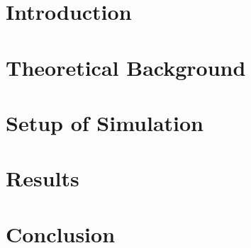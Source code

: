 \documentclass[a4paper,10pt,twoside,ngerman,bibliography=totoc]{scrreprt}
\begin{document}
	\mathswapoff                 %

	\graphicspath{{pics/}{pics/logos/}{pics/diagrams/}{pics/plots/}}
	\pagestyle{empty}
	
	\cleardoublepage
	\cleardoublepage
	
	\cleardoublepage
	
	\pagestyle{plain}
	\vspace*{-2cm} 
	\tableofcontents
	\cleardoublepage
	
	
	\cleardoublepage
	\pagestyle{scrheadings}
	\chapter{Introduction}
	
	\chapter{Theoretical Background}
	
	
	
	
	\chapter{Setup of Simulation}
	
	
	\chapter{Results}
	
	
	
	
	\chapter{Conclusion}
	
	\clearpage
	\renewcommand{\bibname}{Bibliography}
	\printbibliography
	\cleardoublepage
	\appendix
	
	
\end{document}
